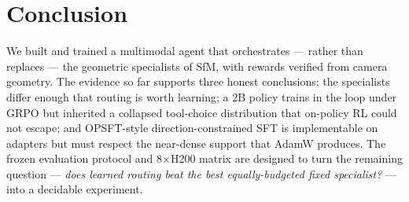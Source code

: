 \documentclass[10pt,twocolumn,letterpaper]{article}
\begin{document}
\section{Conclusion}

We built and trained a multimodal agent that orchestrates — rather than
replaces — the geometric specialists of SfM, with rewards verified from
camera geometry. The evidence so far supports three honest conclusions:
the specialists differ enough that routing is worth learning; a 2B policy
trains in the loop under GRPO but inherited a collapsed tool-choice
distribution that on-policy RL could not escape; and OPSFT-style
direction-constrained SFT is implementable on adapters but must respect
the near-dense support that AdamW produces. The frozen evaluation protocol
and 8$\times$H200 matrix are designed to turn the remaining question —
\emph{does learned routing beat the best equally-budgeted fixed
specialist?} — into a decidable experiment.
\end{document}
